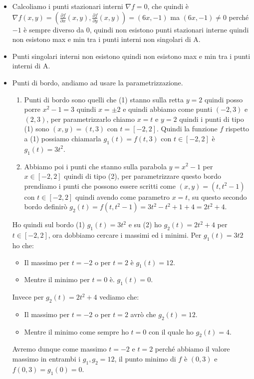 \begin{itemize}
    \item Calcoliamo i punti stazionari interni $\nabla f = 0$, che quindi è $\nabla f(x,y) = (\frac{\partial f}{\partial x}(x,y), \frac{\partial f}{\partial y}(x,y)) = (6x, -1)$ ma $(6x,-1) \neq 0$ perché $-1$ è sempre diverso da 0, quindi non esistono punti stazionari interne quindi non esistono max e min tra i punti interni non singolari di A.
    \item Punti singolari interni non esistono quindi non esistono max e min tra i punti interni di A.
    \item Punti di bordo, andiamo ad usare la parametrizzazione. 
    \begin{enumerate}
        \item Punti di bordo sono quelli che (1) stanno sulla retta $y = 2$ quindi posso porre $x^2 -1 = 3$ quindi $ x = \pm 2$ e quindi abbiamo come punti $(-2,3)$ e $(2,3)$, per parametrizzarlo chiamo $x = t$ e $y = 2$ quindi i punti di tipo (1) sono $(x,y) = (t,3)$ con $t = [-2,2]$. Quindi la funzione $f$ rispetto a (1) possiamo chiamarla $g_1(t) = f(t,3)$ con $t \in [-2,2]$ è $g_1(t) = 3t^2$.
        \item Abbiamo poi i punti che stanno sulla parabola $y = x^2 - 1$ per $x \in [-2,2]$ quindi di tipo (2), per parametrizzare questo bordo prendiamo i punti che possono essere scritti come $(x,y) = (t, t^2-1)$ con $t \in [-2,2]$ quindi avendo come parametro $x = t$, su questo secondo bordo definirò $g_2(t) = f(t,t^2-1) = 3t^2 - t^2 + 1+4 = 2t^2+4$.
    \end{enumerate}
    Ho quindi sul bordo (1) $g_1(t) = 3t^2$ e su (2) ho $g_2(t) = 2t^2+4$ per $t \in [-2,2]$, ora dobbiamo cercare i massimi ed i minimi. Per $g_1(t) = 3t2$ ho che:
    \begin{itemize}
        \item Il massimo per $t = -2$ o per $t = 2$ è $g_1(t) = 12$.
        \item Mentre il minimo per $t = 0$ è. $g_1(t) = 0$.
    \end{itemize}
    Invece per $g_2(t) = 2t^2 + 4$ vediamo che:
    \begin{itemize}
        \item Il massimo per $t = -2$ o per $t = 2$ avrò che $g_2 (t) = 12$.
        \item Mentre il minimo come sempre ho $t=0$ con il quale ho $g_2(t) = 4$.
    \end{itemize}
    Avremo dunque come massimo $t=-2$ e $t = 2$ perché abbiamo il valore massimo in entrambi i $g_1, g_2 = 12$, il punto minimo di $f$ è $(0,3)$ e $f(0,3) = g_1(0) = 0$.
\end{itemize}

